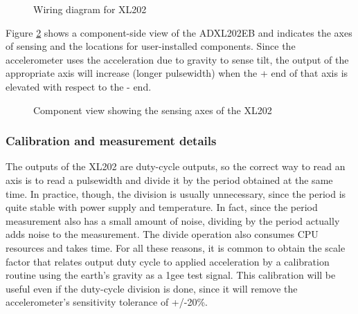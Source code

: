 \documentclass{article}
\begin{document}
\epsfysize=2.0in
\begin{figure}[htbp]
\begin{center}
\caption{Wiring diagram for XL202}
\label{XLwiring}
\end{center}
\end{figure}


Figure \ref{sensingaxes} shows a component-side view of the ADXL202EB
and indicates 
the axes of sensing and the locations for user-installed components.
Since the accelerometer uses the acceleration due to gravity to sense
tilt, the output of the appropriate axis will increase (longer
pulsewidth) when the + end of that axis is elevated with respect to
the - end.

\epsfysize=2.0in
\begin{figure}[htbp]
\begin{center}
\caption{Component view showing the sensing axes of the XL202}
\label{sensingaxes}
\end{center}
\end{figure}


\subsubsection{Calibration and measurement details}

The outputs of the XL202 are duty-cycle outputs, so the correct way to
read an axis is to read a pulsewidth and divide it by the period
obtained at the same time.  In practice, though, the division is
usually unnecessary, since the period is quite stable with power
supply and temperature.  In fact, since the period measurement also
has a small amount of noise, dividing by the period actually adds
noise to the measurement.  The divide operation also consumes CPU
resources and takes time.  For all these reasons, it is common to
obtain the scale factor that relates output duty cycle to applied
acceleration by a calibration routine using the earth's gravity as a
1gee test signal.  This calibration will be useful even if the
duty-cycle division is done, since it will remove the accelerometer's
sensitivity tolerance of +/-20\%. 
\end{document}
